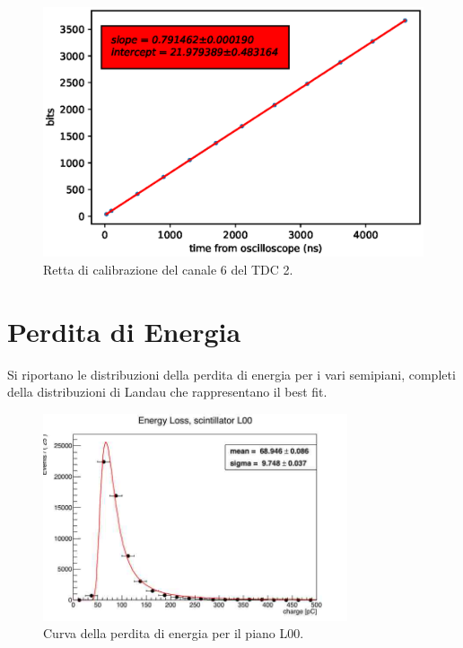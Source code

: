 \begin{figure}[H]
  \centering
  \includegraphics[width=.8\textwidth]{plots/tdc26.eps}
  \caption{Retta di calibrazione del canale 6 del TDC 2.}
  \label{fig:tdc26}
\end{figure}




\chapter{Perdita di Energia}             %
Si riportano le distribuzioni della perdita di energia per i vari semipiani, completi della distribuzioni di Landau che rappresentano il best fit.

\begin{figure}[H]
  \centering
  \includegraphics[width=0.8\textwidth]{plots/energy_L00.jpg}
  \caption{Curva della perdita di energia per il piano L00.}
  \label{fig:l00}
\end{figure}

